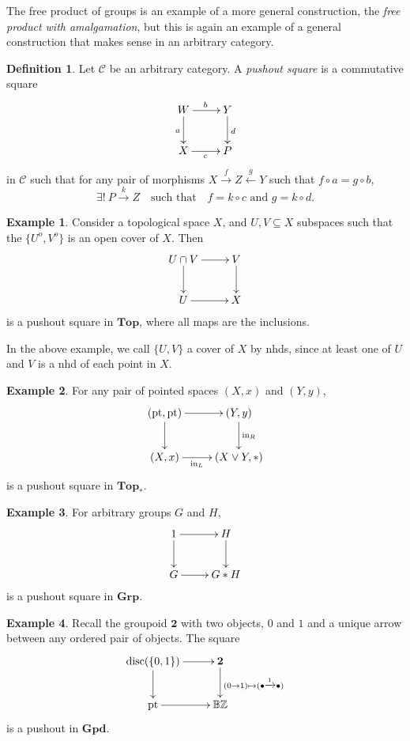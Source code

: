 \documentclass{tufte-handout}
\def\cC {\mathcal{C}}
\def\pt {\mathrm{pt}}
\def\Top {\mathbf{Top}}
\def\Grp {\mathbf{Grp}}
\def\Gpd {\mathbf{Gpd}}
\def\ZZ{\mathbb{Z}}
\DeclareMathOperator{\disc}{disc}
\theoremstyle{definition}
\newtheorem{definition}{Definition}
\newtheorem{example}{Example}
\begin{document}
The free product of groups is an example of a more general construction, the \emph{free product with amalgamation}, but this is again an example of a general construction that makes sense in an arbitrary category.

\begin{definition}
Let $\cC$ be an arbitrary category. A \emph{pushout square} is a commutative square
\[
	\xymatrix{
		W\ar[r]^b \ar[d]_a & Y \ar[d]^d \\
		X \ar[r]_c & P
	}
\]
in $\cC$ such that for any pair of morphisms $X\xrightarrow{f} Z \xleftarrow{g} Y$ such that 
$f\circ a = g\circ b$,
\[
	\exists!\ P\xrightarrow{k} Z \quad \text{such that} \quad  f=k\circ c \text{ and } g=k\circ d.
\]
\end{definition}

\begin{example}
Consider a topological space $X$, and $U,V \subseteq X$ subspaces such that the $\{U^o,V^o\}$ is an open cover of $X$. Then
\[
	\xymatrix{
		U\cap V\ar[r] \ar[d] & V \ar[d] \\
		U \ar[r] & X
	}
\]
is a pushout square in $\Top$, where all maps are the inclusions.
\end{example}

In the above example, we call $\{U,V\}$ a cover of $X$ by nhds, since at least one of $U$ and $V$ is a nhd of each point in $X$.

\begin{example}
For any pair of pointed spaces $(X,x)$ and $(Y,y)$, 
\[
	\xymatrix{
		(\pt,\pt)\ar[r] \ar[d] & (Y,y) \ar[d]^{\mathrm{in}_R} \\
		(X,x) \ar[r]_-{\mathrm{in}_L} & (X\vee Y,\ast)
	}
\]
is a pushout square in $\Top_*$.
\end{example}

\begin{example}
For arbitrary groups $G$ and $H$,
\[
	\xymatrix{
		1\ar[r] \ar[d] & H \ar[d] \\
		G \ar[r] & G\ast H
	}
\]
is a pushout square in $\Grp$.
\end{example}

\begin{example}
Recall the groupoid $\mathbf{2}$ with two objects, $0$ and $1$ and a unique arrow between any ordered pair of objects. The square
\[
	\xymatrix{
		\disc(\{0,1\}) \ar[r] \ar[d] & \mathbf{2}\ar[d]^{(0\to 1)\mapsto (\bullet \xrightarrow{1} \bullet)} \\
		\pt \ar[r]&  \mathbb{B}\ZZ
	}
\]
is a pushout in $\Gpd$.
\end{example}
\end{document}
